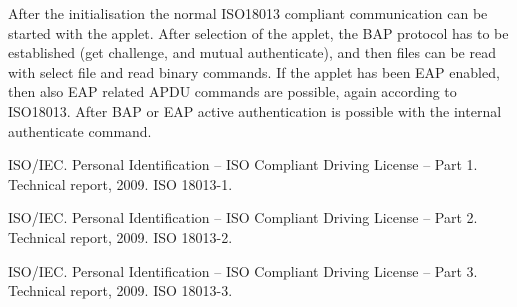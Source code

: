\documentclass{article}
\begin{document}
After the initialisation the normal ISO18013 compliant communication
can be started with the applet. After selection of the applet, the BAP
protocol has to be established (get challenge, and mutual
authenticate), and then files can be read with select file and read
binary commands. If the applet has been EAP enabled, then also EAP
related APDU commands are possible, again according to ISO18013. After
BAP or EAP active authentication is possible with the internal
authenticate command.

\begin{thebibliography}{1}
 ISO/IEC.  \newblock Personal Identification -- ISO
  Compliant Driving License -- Part 1.  \newblock Technical report,
  2009.  \newblock ISO 18013-1.

 ISO/IEC.  \newblock Personal Identification -- ISO
  Compliant Driving License -- Part 2.  \newblock Technical report,
  2009.  \newblock ISO 18013-2.

 ISO/IEC.  \newblock Personal Identification -- ISO
  Compliant Driving License -- Part 3.  \newblock Technical report,
  2009.  \newblock ISO 18013-3.

\end{thebibliography}
\end{document}

